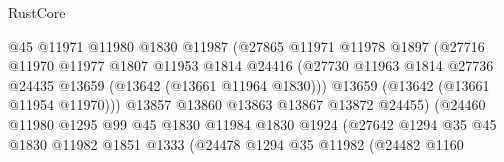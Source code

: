 \begin{lexlean}{RustCore}
\begin{coremodule}
                                      @45
                                      @11971
                                      @11980
                                      @1830
                                      @11987
                                      (@27865
                                        @11971
                                        @11978
                                        @1897
                                        (@27716
                                          @11970
                                          @11977
                                          @1807
                                          @11953
                                          @1814
                                          @24416
                                          (@27730
                                            @11963
                                            @1814
                                            @27736
                                            @24435
                                            @13659
                                            (@13642 (@13661 @11964 @1830)))
                                          @13659
                                          (@13642 (@13661 @11954 @11970)))
                                        @13857
                                        @13860
                                        @13863
                                        @13867
                                        @13872
                                        @24455)
                                      (@24460
                                        @11980
                                        @1295
                                        @99
                                        @45
                                        @1830
                                        @11984
                                        @1830
                                        @1924
                                        (@27642
                                          @1294
                                          @35
                                          @45
                                          @1830
                                          @11982
                                          @1851
                                          @1333
                                          (@24478
                                            @1294
                                            @35
                                            @11982
                                            (@24482
                                              @1160

\end{coremodule}
\end{lexlean}
